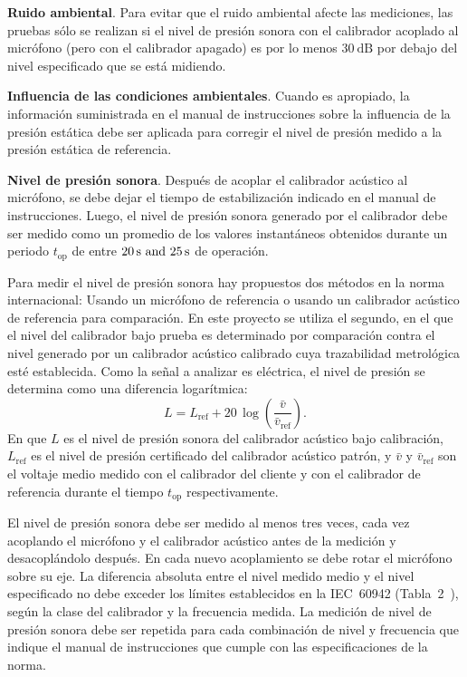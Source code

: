 \textbf{Ruido ambiental}.
Para evitar que el ruido ambiental afecte las mediciones, las pruebas sólo se realizan si el nivel de presión sonora con el calibrador acoplado al micrófono (pero con el calibrador apagado) es por lo menos $\qty{30}{\dB}$ por debajo del nivel especificado que se está midiendo.

\textbf{Influencia de las condiciones ambientales}.
Cuando es apropiado, la información suministrada en el manual de instrucciones sobre la influencia de la presión estática debe ser aplicada para corregir el nivel de presión medido a la presión estática de referencia.

\textbf{Nivel de presión sonora}.
Después de acoplar el calibrador acústico al micrófono, se debe dejar el tiempo de estabilización indicado en el manual de instrucciones.
Luego, el nivel de presión sonora generado por el calibrador debe ser medido como un promedio de los valores instantáneos obtenidos durante un periodo $t_{\mathrm{op}}$ de entre $\qtylist{20;25}{\s}$ de operación.

Para medir el nivel de presión sonora hay propuestos dos métodos en la norma internacional: Usando un micrófono de referencia o usando un calibrador acústico de referencia para comparación.
En este proyecto se utiliza el segundo, en el que el nivel del calibrador bajo prueba es determinado por comparación contra el nivel generado por un calibrador acústico calibrado cuya trazabilidad metrológica esté establecida.
Como la señal a analizar es eléctrica, el nivel de presión se determina como una diferencia logarítmica:
\begin{equation}
    \label{eq:spl_from_voltage}
    L = L_{\mathrm{ref}} + 20\,\log\left(\frac{\bar{v}}{\bar{v}_{\mathrm{ref}}}\right).
\end{equation}
%
En que $L$ es el nivel de presión sonora del calibrador acústico bajo calibración, $L_{\mathrm{ref}}$ es el nivel de presión certificado del calibrador acústico patrón, y $\bar{v}$ y $\bar{v}_{\mathrm{ref}}$ son el voltaje medio medido con el calibrador del cliente y con el calibrador de referencia durante el tiempo $t_{\mathrm{op}}$ respectivamente.

El nivel de presión sonora debe ser medido al menos tres veces, cada vez acoplando el micrófono y el calibrador acústico antes de la medición y desacoplándolo después.
En cada nuevo acoplamiento se debe rotar el micrófono sobre su eje.
La diferencia absoluta entre el nivel medido medio y el nivel especificado no debe exceder los límites establecidos en la \mbox{IEC 60942} (\mbox{Tabla 2}~\citeyear{IEC_TC29_2017}), según la clase del calibrador y la frecuencia medida.
La medición de nivel de presión sonora debe ser repetida para cada combinación de nivel y frecuencia que indique el manual de instrucciones que cumple con las especificaciones de la norma.

